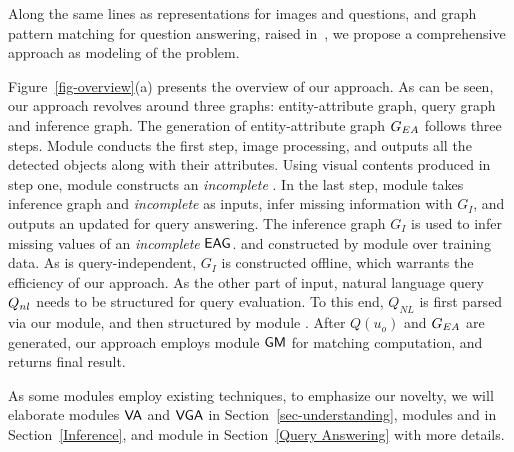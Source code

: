 Along the same lines as representations for images and questions, and graph pattern matching for question answering, raised in~\cite{peixi2019}, we propose a comprehensive approach as modeling of the \vqa problem. %

Figure~\ref{fig-overview}(a) presents the overview of our approach. As can be seen, our approach revolves around three graphs: entity-attribute graph, query graph and inference graph. The generation of entity-attribute graph $G_{EA}$ follows three steps. Module  conducts the first step, \ie image processing, and outputs all the detected objects along with their attributes. Using visual contents produced in step one, module  constructs an {\em incomplete} . In the last step, module  takes inference graph and {\em incomplete}  as inputs, infer missing information with $G_I$, and outputs an updated  for query answering. 
The inference graph $G_I$ is used to infer missing values of an {\em incomplete} ${\mathsf{EAG}}$. %
and constructed by module  over training data. As is query-independent, $G_I$ is constructed offline, which warrants the efficiency of our approach. %
As the other part of input, natural language query $Q_{nl}$ needs to be structured for query evaluation. To this end, $Q_{NL}$ is first parsed via our  module, and then structured by module . After $Q(u_o)$ and $G_{EA}$ are generated, our approach employs module ${\mathsf{GM}}$ for matching computation, and returns final result.  %


As some modules employ existing techniques, to emphasize our novelty, we will elaborate modules ${\mathsf{VA}}$ and ${\mathsf{VGA}}$ in Section~\ref{sec-understanding}, modules  and  in Section~\ref{Inference}, and module  in Section~\ref{Query Answering} with more details. 